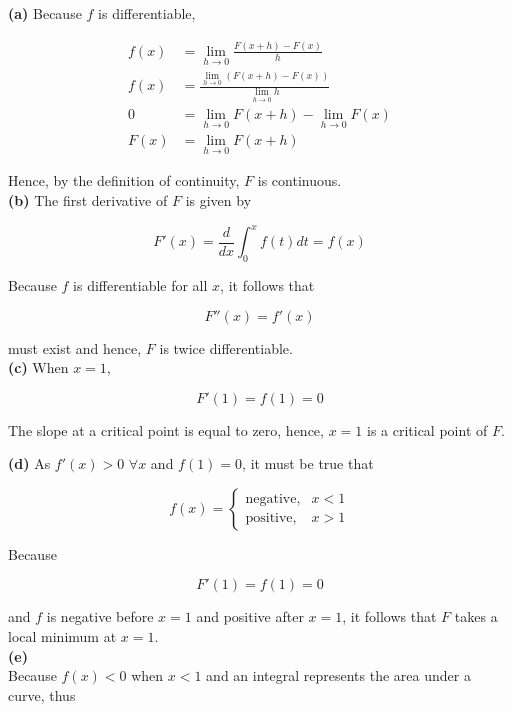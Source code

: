 \documentclass{article}
\begin{document}
    \textbf{(a)}
    Because $f$ is differentiable,

    \begin{align*}
        f(x)    &= \lim_{h\to 0} \frac{F(x+h)-F(x)}{h} \\
        f(x)    &= \frac{\lim_{h\to 0} (F(x+h)-F(x))}{\lim_{h\to 0} h} \\
        0       &= \lim_{h\to 0} F(x+h) -\lim_{h\to 0} F(x) \\
        F(x)    &= \lim_{h\to 0} F(x+h)
    \end{align*}

    Hence, by the definition of continuity, $F$ is continuous. \\


    \textbf{(b)}
    The first derivative of $F$ is given by

    \[
        F'(x) = \frac{d}{dx}\int^x_0 f(t)dt = f(x)
    \]

    Because $f$ is differentiable for all $x$, it follows that

    \[
        F''(x) = f'(x)
    \]

    must exist and hence, $F$ is twice differentiable. \\


    \textbf{(c)}
    When $x=1$,

    \[
        F'(1) = f(1) = 0
    \]

    The slope at a critical point is equal to zero, hence, $x=1$ is a critical point of $F$.

    \pagebreak
    \thispagestyle{6}

    \textbf{(d)}
    As $f'(x)>0 $ $\forall x$ and $f(1)=0$, it must be true that

    \[
        f(x)=
        \begin{cases}
            \text{negative},     & x<1 \\
            \text{positive},     & x>1
        \end{cases}
    \]

    Because

    \[
        F'(1) = f(1) = 0
    \]

    and $f$ is negative before $x=1$ and positive after $x=1$, it follows that $F$ takes a local minimum at $x=1$. \\

    \textbf{(e)} \\
    Because $f(x)<0$ when $x<1$ and an integral represents the area under a curve, thus
\end{document}
